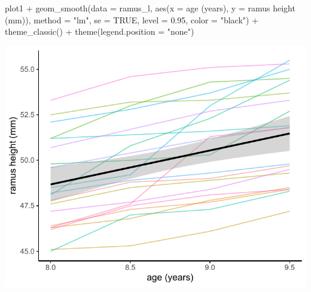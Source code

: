 \documentclass[
  9pt,
  ignorenonframetext,
]{beamer}
\newenvironment{Shaded}{\begin{snugshade}}{\end{snugshade}}
\newcommand{\AttributeTok}[1]{\textcolor[rgb]{0.77,0.63,0.00}{#1}}
\newcommand{\ConstantTok}[1]{\textcolor[rgb]{0.00,0.00,0.00}{#1}}
\newcommand{\FloatTok}[1]{\textcolor[rgb]{0.00,0.00,0.81}{#1}}
\newcommand{\FunctionTok}[1]{\textcolor[rgb]{0.00,0.00,0.00}{#1}}
\newcommand{\NormalTok}[1]{#1}
\newcommand{\SpecialCharTok}[1]{\textcolor[rgb]{0.00,0.00,0.00}{#1}}
\newcommand{\StringTok}[1]{\textcolor[rgb]{0.31,0.60,0.02}{#1}}
\begin{document}
\begin{frame}[fragile]{}
\protect\hypertarget{section-2}{}
\tiny

\begin{Shaded}
\begin{Highlighting}[]
\NormalTok{plot1 }\SpecialCharTok{+}  \FunctionTok{geom\_smooth}\NormalTok{(}\AttributeTok{data =}\NormalTok{ ramus\_l, }
                     \FunctionTok{aes}\NormalTok{(}\AttributeTok{x =} \StringTok{\textasciigrave{}}\AttributeTok{age (years)}\StringTok{\textasciigrave{}}\NormalTok{,}
                         \AttributeTok{y =} \StringTok{\textasciigrave{}}\AttributeTok{ramus height (mm)}\StringTok{\textasciigrave{}}\NormalTok{),}
                     \AttributeTok{method =} \StringTok{"lm"}\NormalTok{, }\AttributeTok{se =} \ConstantTok{TRUE}\NormalTok{, }
                     \AttributeTok{level =} \FloatTok{0.95}\NormalTok{, }\AttributeTok{color =} \StringTok{"black"}\NormalTok{) }\SpecialCharTok{+}
  \FunctionTok{theme\_classic}\NormalTok{() }\SpecialCharTok{+}
  \FunctionTok{theme}\NormalTok{(}\AttributeTok{legend.position =} \StringTok{"none"}\NormalTok{)}
\end{Highlighting}
\end{Shaded}

\begin{center}\includegraphics[width=0.6\linewidth]{figs_L2/unnamed-chunk-5-1} \end{center}

\tiny
\end{frame}
\end{document}
